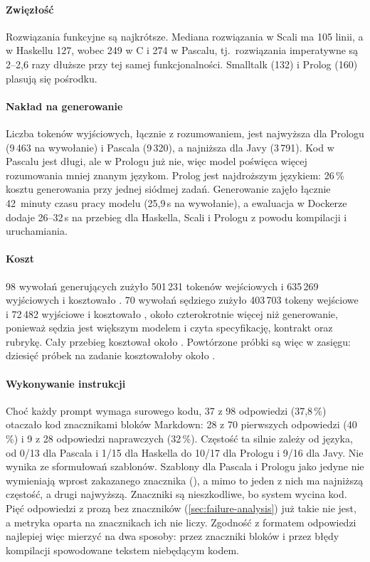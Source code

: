 \paragraph{Zwięzłość} Rozwiązania funkcyjne są najkrótsze. Mediana rozwiązania w Scali ma 105 linii,
a w Haskellu 127, wobec 249 w C i 274 w Pascalu, tj.\ rozwiązania imperatywne są 2--2,6 razy
dłuższe przy tej samej funkcjonalności. Smalltalk (132) i Prolog (160) plasują się pośrodku.

\paragraph{Nakład na generowanie} Liczba tokenów wyjściowych, łącznie z rozumowaniem, jest
najwyższa dla Prologu (9\,463 na wywołanie) i Pascala (9\,320), a najniższa dla Javy (3\,791). Kod
w Pascalu jest długi, ale w Prologu już nie, więc model poświęca więcej rozumowania mniej znanym
językom. Prolog jest najdroższym językiem: 26\,\% kosztu generowania przy jednej siódmej zadań.
Generowanie zajęło łącznie 42~minuty czasu pracy modelu (25,9\,s na wywołanie), a ewaluacja
w Dockerze dodaje 26--32\,s na przebieg dla Haskella, Scali i Prologu z powodu kompilacji
i uruchamiania.

\paragraph{Koszt} 98 wywołań generujących zużyło 501\,231 tokenów wejściowych i 635\,269 wyjściowych
i kosztowało . 70 wywołań sędziego zużyło 403\,703 tokeny wejściowe i 72\,482 wyjściowe
i kosztowało , około czterokrotnie więcej niż generowanie, ponieważ sędzia jest większym
modelem i czyta specyfikację, kontrakt oraz rubrykę. Cały przebieg kosztował około .
Powtórzone próbki są więc w zasięgu: dziesięć próbek na zadanie kosztowałoby około .

\paragraph{Wykonywanie instrukcji} Choć każdy prompt wymaga surowego kodu, 37 z 98 odpowiedzi
(37,8\,\%) otaczało kod znacznikami bloków Markdown: 28 z 70 pierwszych odpowiedzi (40\,\%) i 9 z 28
odpowiedzi naprawczych (32\,\%). Częstość ta silnie zależy od języka, od 0/13 dla Pascala i 1/15 dla
Haskella do 10/17 dla Prologu i 9/16 dla Javy. Nie wynika ze sformułowań szablonów. Szablony dla
Pascala i Prologu jako jedyne nie wymieniają wprost zakazanego znacznika (),
a mimo to jeden z nich ma najniższą częstość, a drugi najwyższą. Znaczniki są nieszkodliwe, bo system
wycina kod. Pięć odpowiedzi z prozą bez znaczników (\cref{sec:failure-analysis}) już takie nie jest,
a metryka oparta na znacznikach ich nie liczy. Zgodność z formatem odpowiedzi najlepiej więc mierzyć
na dwa sposoby: przez znaczniki bloków i przez błędy kompilacji spowodowane tekstem niebędącym
kodem.
